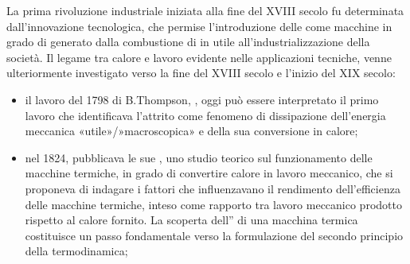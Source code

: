 \documentclass[letterpaper,10pt,italian]{jupyterBook}
\begin{document}
\sphinxAtStartPar
La prima rivoluzione industriale iniziata alla fine del XVIII secolo fu determinata dall’innovazione tecnologica, che permise l’introduzione delle  come macchine in grado di  generato dalla combustione di  in  utile all’industrializzazione della società.
Il legame tra calore e lavoro evidente nelle applicazioni tecniche, venne ulteriormente investigato verso la fine del XVIII secolo e l’inizio del XIX secolo:
\begin{itemize}
\item {} 
\sphinxAtStartPar
il lavoro del 1798 di B.Thompson, , oggi può essere interpretato il primo lavoro che identificava l’attrito come fenomeno di dissipazione dell’energia meccanica «utile»/»macroscopica» e della sua conversione in calore;

\item {} 
\sphinxAtStartPar
nel 1824,  pubblicava le sue , uno studio teorico sul funzionamento delle macchine termiche, in grado di convertire calore in lavoro meccanico, che si proponeva di indagare i fattori che influenzavano il rendimento dell’efficienza delle macchine termiche, inteso come rapporto tra lavoro meccanico prodotto rispetto al calore fornito. La scoperta dell” di una macchina termica costituisce un passo fondamentale verso la formulazione del secondo principio della termodinamica;


\end{itemize}
\end{document}
